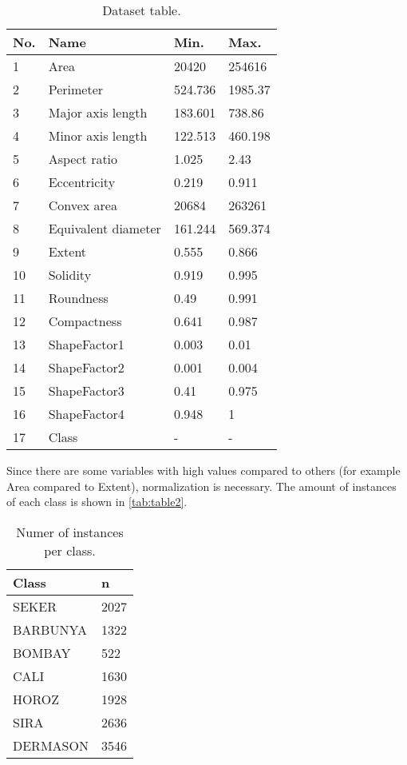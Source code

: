 \documentclass[a4paper,11pt]{article}
\begin{document}
\begin{table}[h]
\centering
\begin{tabular}{||l|l|l|l||}
	\hline
	No. & Name & Min. & Max.\\
	\hline
	1 & Area & 20420 & 254616\\
	2 & Perimeter & 524.736 & 1985.37\\
	3 & Major axis length & 183.601 & 738.86\\
	4 & Minor axis length & 122.513 & 460.198\\
	5 & Aspect ratio & 1.025 & 2.43\\
	6 & Eccentricity & 0.219 & 0.911\\
	7 & Convex area & 20684 & 263261\\
	8 & Equivalent diameter & 161.244 & 569.374\\
	9 & Extent & 0.555 & 0.866\\
	10 & Solidity & 0.919 & 0.995\\
	11 & Roundness & 0.49 & 0.991\\
	12 & Compactness & 0.641 & 0.987\\
	13 & ShapeFactor1 & 0.003 & 0.01\\
	14 & ShapeFactor2 & 0.001 & 0.004\\
	15 & ShapeFactor3 & 0.41 & 0.975\\
	16 & ShapeFactor4 & 0.948 & 1\\
	17 & Class & - & -\\
	\hline
\end{tabular}
\caption{Dataset table.}
\label{tab:table1}
\end{table}

Since there are some variables with high values compared to others (for example Area compared to Extent), normalization is necessary. The amount of instances of each class is shown in \autoref{tab:table2}.

\begin{table}[h]
\centering
\begin{tabular}{||l|l||}
	\hline
	Class & n\\
	\hline
	SEKER & 2027\\
	BARBUNYA & 1322\\
	BOMBAY & 522\\
	CALI & 1630\\
	HOROZ & 1928\\
	SIRA & 2636\\
	DERMASON & 3546\\
	\hline
\end{tabular}
\caption{Numer of instances per class.}
\label{tab:table2}
\end{table}
\end{document}
